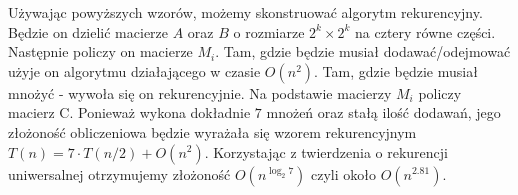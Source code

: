 Używając powyższych wzorów, możemy skonstruować algorytm rekurencyjny.
Będzie on dzielić macierze $A$ oraz $B$ o rozmiarze $2^k \times 2^k$ na cztery równe części.
Następnie policzy on macierze $M_i$.
Tam, gdzie będzie musiał dodawać/odejmować użyje on algorytmu działającego w czasie $O(n^2)$.
Tam, gdzie będzie musiał mnożyć - wywoła się on rekurencyjnie.
Na podstawie macierzy $M_i$ policzy macierz C.
Ponieważ wykona dokładnie $7$ mnożeń oraz stałą ilość dodawań, jego złożoność obliczeniowa będzie wyrażała się wzorem rekurencyjnym $T(n) = 7\cdot T(n/2) + O(n^2)$.
Korzystając z twierdzenia o rekurencji uniwersalnej otrzymujemy złożoność $O(n^{\log_2 7})$ czyli około $O(n^{2.81})$.